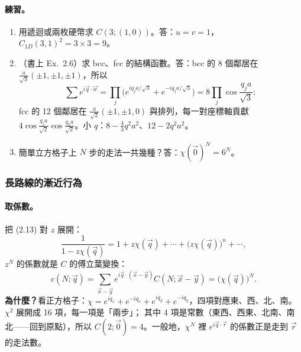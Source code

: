 \paragraph{練習。}
\begin{enumerate}
\item 用遞迴或兩枚硬幣求 $C(3;(1,0))$。\quad 答：$u=v=1$，$C_{1D}(3,1)^2=3\times3=9$。
\item（書上 Ex.~2.6）求 bcc、fcc 的結構函數。\quad 答：bcc 的 8 個鄰居在 $\frac{a}{\sqrt3}(\pm1,\pm1,\pm1)$，所以
\[\textstyle\sum e^{i\vec q\cdot\vec w}=\prod_j\big(e^{iq_ja/\sqrt3}+e^{-iq_ja/\sqrt3}\big)=8\prod_j\cos\frac{q_ja}{\sqrt3};\]
fcc 的 12 個鄰居在 $\frac{a}{\sqrt2}(\pm1,\pm1,0)$ 與排列，每一對座標軸貢獻 $4\cos\frac{q_ja}{\sqrt2}\cos\frac{q_ka}{\sqrt2}$。小 $q$：$8-\frac43q^2a^2$、$12-2q^2a^2$。
\item 簡單立方格子上 $N$ 步的走法一共幾種？\quad 答：$\chi(\vec0)^N=6^N$。
\end{enumerate}

\subsubsection{長路線的漸近行為}

\paragraph{取係數。}
把 (2.13) 對 $z$ 展開：
\[\frac{1}{1-z\chi(\vec q)}=1+z\chi(\vec q)+\cdots+\big(z\chi(\vec q)\big)^n+\cdots,\tag{2.14}\]
$z^N$ 的係數就是 $C$ 的傅立葉變換：
\[c(N;\vec q)=\sum_{\vec x-\vec y}e^{i\vec q\cdot(\vec x-\vec y)}C(N;\vec x-\vec y)=\big(\chi(\vec q)\big)^N.\tag{2.15, 2.16}\]
\textbf{為什麼？}看正方格子：$\chi=e^{iq_x}+e^{-iq_x}+e^{iq_y}+e^{-iq_y}$，四項對應東、西、北、南。$\chi^2$ 展開成 16 項，每一項是「兩步」；
其中 4 項是常數（東西、西東、北南、南北——回到原點），所以 $C(2;\vec0)=4$。一般地，$\chi^N$ 裡 $e^{i\vec q\cdot\vec r}$ 的係數正是走到 $\vec r$ 的走法數。

